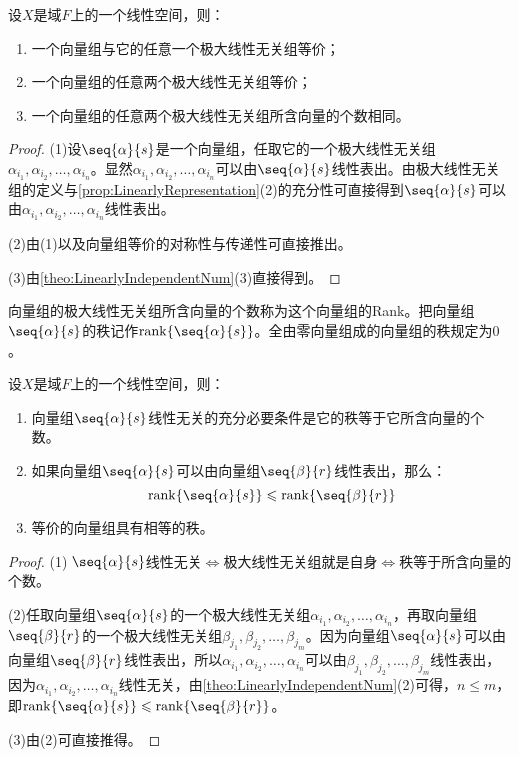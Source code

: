 \begin{property}\label{prop:MaximalLinearlyIndependentSystem}
	设$X$是域$F$上的一个线性空间，则：
	\begin{enumerate}
		\item 一个向量组与它的任意一个极大线性无关组等价；
		\item 一个向量组的任意两个极大线性无关组等价；
		\item 一个向量组的任意两个极大线性无关组所含向量的个数相同。
	\end{enumerate}
\end{property}
\begin{proof}
	(1)设$\seq{\alpha}{s}$是一个向量组，任取它的一个极大线性无关组$\alpha_{i_1},\alpha_{i_2},\dots,\alpha_{i_n}$。显然$\alpha_{i_1},\alpha_{i_2},\dots,\alpha_{i_n}$可以由$\seq{\alpha}{s}$线性表出。由极大线性无关组的定义与\cref{prop:LinearlyRepresentation}(2)的充分性可直接得到$\seq{\alpha}{s}$可以由$\alpha_{i_1},\alpha_{i_2},\dots,\alpha_{i_n}$线性表出。\par
	(2)由(1)以及向量组等价的对称性与传递性可直接推出。\par
	(3)由\cref{theo:LinearlyIndependentNum}(3)直接得到。
\end{proof}
\begin{definition}
	向量组的极大线性无关组所含向量的个数称为这个向量组的\gls{Rank}。把向量组$\seq{\alpha}{s}$的秩记作$\operatorname{rank}\{\seq{\alpha}{s}\}$。全由零向量组成的向量组的秩规定为$0$。
\end{definition}
\begin{property}\label{prop:Rank}
	设$X$是域$F$上的一个线性空间，则：
	\begin{enumerate}
		\item 向量组$\seq{\alpha}{s}$线性无关的充分必要条件是它的秩等于它所含向量的个数。
		\item 如果向量组$\seq{\alpha}{s}$可以由向量组$\seq{\beta}{r}$线性表出，那么：
		\begin{equation*}
			\operatorname{rank}\{\seq{\alpha}{s}\}\leqslant\operatorname{rank}\{\seq{\beta}{r}\}
		\end{equation*}
		\item 等价的向量组具有相等的秩。
	\end{enumerate}
\end{property}
\begin{proof}
	(1)$\;\seq{\alpha}{s}$线性无关$\Leftrightarrow$极大线性无关组就是自身$\Leftrightarrow$秩等于所含向量的个数。\par
	(2)任取向量组$\seq{\alpha}{s}$的一个极大线性无关组$\alpha_{i_1},\alpha_{i_2},\dots,\alpha_{i_n}$，再取向量组$\seq{\beta}{r}$的一个极大线性无关组$\beta_{j_1},\beta_{j_2},\dots,\beta_{j_m}$。因为向量组$\seq{\alpha}{s}$可以由向量组$\seq{\beta}{r}$线性表出，所以$\alpha_{i_1},\alpha_{i_2},\dots,\alpha_{i_n}$可以由$\beta_{j_1},\beta_{j_2},\dots,\beta_{j_m}$线性表出，因为$\alpha_{i_1},\alpha_{i_2},\dots,\alpha_{i_n}$线性无关，由\cref{theo:LinearlyIndependentNum}(2)可得，$n\leqslant m$，即$\operatorname{rank}\{\seq{\alpha}{s}\}\leqslant\operatorname{rank}\{\seq{\beta}{r}\}$。\par
	(3)由(2)可直接推得。
\end{proof}
